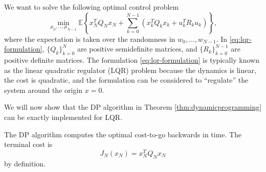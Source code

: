 \documentclass[
]{book}
\theoremstyle{definition}
\theoremstyle{definition}
\theoremstyle{definition}
\theoremstyle{definition}
\theoremstyle{remark}
\begin{document}
We want to solve the following optimal control problem
\begin{equation}
\min_{\mu_0,\dots,\mu_{N-1}} \mathbb{E} \left\{ x_N^T Q_N x_N + \sum_{k=0}^{N-1} \left( x_k^T Q_k x_k + u_k^T R_k u_k \right) \right\},
\label{eq:lqr-formulation}
\end{equation}
where the expectation is taken over the randomness in \(w_0,\dots,w_{N-1}\). In \eqref{eq:lqr-formulation}, \(\{Q_k \}_{k=0}^N\) are positive semidefinite matrices, and \(\{ R_k \}_{k=0}^{N-1}\) are positive definite matrices. The formulation \eqref{eq:lqr-formulation} is typically known as the linear quadratic regulator (LQR) problem because the dynamics is linear, the cost is quadratic, and the formulation can be considered to ``regulate'' the system around the origin \(x=0\).

We will now show that the DP algorithm in Theorem \ref{thm:dynamicprogramming} can be exactly implemented for LQR.

The DP algorithm computes the optimal cost-to-go backwards in time.
The terminal cost is
\[
J_N(x_N) = x_N^T Q_N x_N
\]
by definition.
\end{document}
